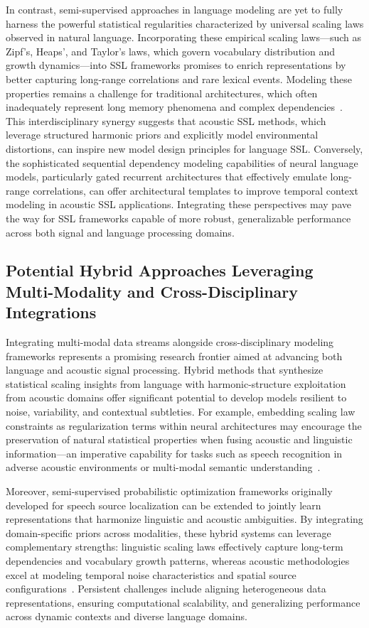 \documentclass[sigconf]{acmart}
\begin{document}
In contrast, semi-supervised approaches in language modeling are yet to fully harness the powerful statistical regularities characterized by universal scaling laws observed in natural language. Incorporating these empirical scaling laws—such as Zipf's, Heaps', and Taylor's laws, which govern vocabulary distribution and growth dynamics—into SSL frameworks promises to enrich representations by better capturing long-range correlations and rare lexical events. Modeling these properties remains a challenge for traditional architectures, which often inadequately represent long memory phenomena and complex dependencies~\cite{ref51}. This interdisciplinary synergy suggests that acoustic SSL methods, which leverage structured harmonic priors and explicitly model environmental distortions, can inspire new model design principles for language SSL. Conversely, the sophisticated sequential dependency modeling capabilities of neural language models, particularly gated recurrent architectures that effectively emulate long-range correlations, can offer architectural templates to improve temporal context modeling in acoustic SSL applications. Integrating these perspectives may pave the way for SSL frameworks capable of more robust, generalizable performance across both signal and language processing domains.

\subsection{Potential Hybrid Approaches Leveraging Multi-Modality and Cross-Disciplinary Integrations}

Integrating multi-modal data streams alongside cross-disciplinary modeling frameworks represents a promising research frontier aimed at advancing both language and acoustic signal processing. Hybrid methods that synthesize statistical scaling insights from language with harmonic-structure exploitation from acoustic domains offer significant potential to develop models resilient to noise, variability, and contextual subtleties. For example, embedding scaling law constraints as regularization terms within neural architectures may encourage the preservation of natural statistical properties when fusing acoustic and linguistic information—an imperative capability for tasks such as speech recognition in adverse acoustic environments or multi-modal semantic understanding~\cite{ref51,ref52}.

Moreover, semi-supervised probabilistic optimization frameworks originally developed for speech source localization can be extended to jointly learn representations that harmonize linguistic and acoustic ambiguities. By integrating domain-specific priors across modalities, these hybrid systems can leverage complementary strengths: linguistic scaling laws effectively capture long-term dependencies and vocabulary growth patterns, whereas acoustic methodologies excel at modeling temporal noise characteristics and spatial source configurations~\cite{ref51,ref52}. Persistent challenges include aligning heterogeneous data representations, ensuring computational scalability, and generalizing performance across dynamic contexts and diverse language domains.
\end{document}
